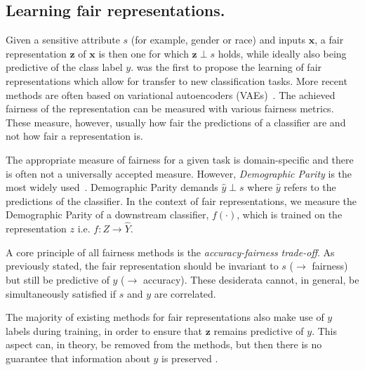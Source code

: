 \subsection{Learning fair representations.}
Given a sensitive attribute $s$ (for example, gender or race) and inputs $\bm{x}$,
a fair representation $\bm{z}$ of $\bm{x}$ is then one for which $\bm{z} \perp s$ holds,
while ideally also being predictive of the class label $y$.
\citet{zemel2013learning} was the first to propose the learning of fair representations which allow for transfer to new classification tasks.
More recent methods are often based on variational autoencoders (VAEs)~\citep{kingma2013auto,louizos2016variational,edwards2016censoring,beutel2017data}.
The achieved fairness of the representation can be measured with various fairness metrics.
These measure, however, usually how fair the predictions of a classifier are
and not how fair a representation is.

The appropriate measure of fairness for a given task is domain-specific \citep{liu2018delayed}
and there is often not a universally accepted measure.
However, \emph{Demographic Parity} is the most widely used~\citep{louizos2016variational,edwards2016censoring,beutel2017data}.
Demographic Parity demands $\hat{y} \perp s$ where $\hat{y}$ refers to the predictions of the classifier.
In the context of fair representations, we measure the Demographic Parity of a downstream classifier, $f(\cdot )$, which is trained on the representation $z$ i.e.  $f: Z \to \hat{Y}$.

A core principle of all fairness methods is the \emph{accuracy-fairness trade-off}.
As previously stated, the fair representation should be invariant to $s$ ($\to$ fairness) but still be predictive of $y$ ($\to$ accuracy).
These desiderata cannot, in general, be simultaneously satisfied if $s$ and $y$ are correlated.


The majority of existing methods for fair representations also make use of $y$ labels during training,
in order to ensure that $\bm{z}$ remains predictive of $y$.
This aspect can, in theory, be removed from the methods,
but then there is no guarantee that information about $y$ is preserved \citep{louizos2016variational}. 

